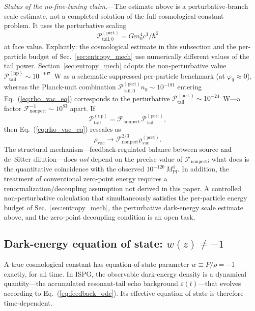 \documentclass[aps,prd,onecolumn,superscriptaddress,nofootinbib,showpacs,12pt,notitlepage]{revtex4-2}
\newcommand{\Mpl}{M_{\mathrm{Pl}}}
\begin{document}
\textit{Status of the no-fine-tuning claim.}---The estimate above is
a perturbative-branch scale estimate, not a completed solution of the
full cosmological-constant problem.  It uses the perturbative scaling
\[
\mathcal{P}_{\mathrm{tail},0}^{\mathrm{(pert)}}
= G m_0^{4} c^{3}/\hbar^{2}
\]
at face value.  Explicitly: the cosmological estimate in this
subsection and the per-particle budget of
Sec.~\ref{sec:entropy_mech} use numerically different values of the
tail power.  Section~\ref{sec:entropy_mech} adopts the
non-perturbative value
$\mathcal{P}_{\mathrm{tail}}^{\mathrm{(np)}} \sim
10^{-107}$~W as a schematic suppressed per-particle benchmark
(at $\varphi_0 \approx 0$), whereas the Planck-unit combination
$\mathcal{P}_{\mathrm{tail},0}^{\mathrm{(pert)}} n_0
\sim 10^{-181}$
entering Eq.~(\ref{eq:rho_vac_eq}) corresponds to the perturbative
$\mathcal{P}_{\mathrm{tail}}^{(\mathrm{pert})}
\sim 10^{-24}$~W---a factor
$\mathcal{F}_{\mathrm{nonpert}}^{-1} \sim 10^{83}$ apart.  If
\[
\mathcal{P}_{\mathrm{tail}}^{\mathrm{(np)}} =
\mathcal{F}_{\mathrm{nonpert}}\,
\mathcal{P}_{\mathrm{tail}}^{\mathrm{(pert)}} ,
\]
then Eq.~(\ref{eq:rho_vac_eq}) rescales as
\[
\rho_{\mathrm{vac}}\rightarrow
\mathcal{F}_{\mathrm{nonpert}}^{2/3}\rho_{\mathrm{vac}}^{\mathrm{(pert)}} .
\]
The structural mechanism---feedback-regulated balance between source
and de~Sitter dilution---does \emph{not} depend on the precise value
of $\mathcal{F}_{\mathrm{nonpert}}$; what does is the quantitative
coincidence with the observed $10^{-120}\,\Mpl^{4}$.  In addition,
the treatment of conventional zero-point energy requires a
renormalization/decoupling assumption not derived in this paper.  A
controlled non-perturbative calculation that simultaneously satisfies
the per-particle energy budget of Sec.~\ref{sec:entropy_mech}, the
perturbative dark-energy scale estimate above, and the zero-point
decoupling condition is an open task.

\subsection{Dark-energy equation of state: \texorpdfstring{$w(z) \neq -1$}{w(z) != -1}}
\label{sec:dark_energy}

A true cosmological constant has equation-of-state parameter
$w \equiv P/\rho = -1$ exactly, for all time.  In ISPG,
the observable dark-energy density is a dynamical
quantity---the accumulated resonant-tail echo
background $\varepsilon(t)$---that evolves according to
Eq.~(\ref{eq:feedback_ode}).  Its effective equation of
state is therefore time-dependent.
\end{document}
